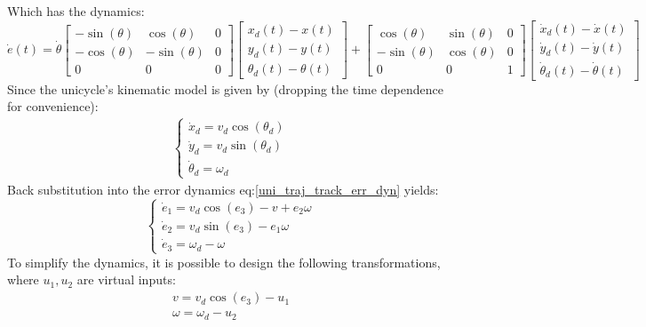 Which has the dynamics:
\begin{equation}\label{uni_traj_track_err_dyn}
    \dot{e}(t)=\dot{\theta}
    \begin{bmatrix}
        -\sin(\theta) & \cos(\theta) & 0 \\
        -\cos(\theta) & -\sin(\theta) & 0 \\
        0 & 0 & 0
    \end{bmatrix}
    \begin{bmatrix}
        x_d(t)-x(t)\\y_d(t)-y(t)\\\theta_d(t)-\theta(t)
    \end{bmatrix} +
    \begin{bmatrix}
        \cos(\theta) & \sin(\theta) & 0 \\
        -\sin(\theta) & \cos(\theta) & 0 \\
        0 & 0 & 1
    \end{bmatrix}
    \begin{bmatrix}
        \dot{x}_d(t)-\dot{x}(t)\\\dot{y}_d(t)-\dot{y}(t)\\ \dot{\theta}_d(t)-\dot{\theta}(t)
    \end{bmatrix}
\end{equation}
Since the unicycle's kinematic model is given by (dropping the time dependence for convenience):
\begin{gather}\label{uni_kinematic_model}
    \begin{cases}
        \dot{x}_d=v_d\cos(\theta_d) \\
        \dot{y}_d=v_d\sin(\theta_d) \\
        \dot{\theta}_d=\omega_d
    \end{cases}
\end{gather}
Back substitution into the error dynamics eq:\ref{uni_traj_track_err_dyn} yields:
\begin{equation}\label{uni_traj_track_full_err_dyn}
    \begin{cases}
        \dot{e}_1=v_d\cos(e_3)-v+e_2\omega \\
        \dot{e}_2=v_d\sin(e_3)-e_1\omega \\
        \dot{e}_3=\omega_d-\omega
    \end{cases}
\end{equation}
To simplify the dynamics, it is possible to design the following transformations, where $u_1,u_2$ are virtual inputs:
\begin{gather*}
    v=v_d\cos(e_3)-u_1\\
    \omega=\omega_d-u_2
\end{gather*}
